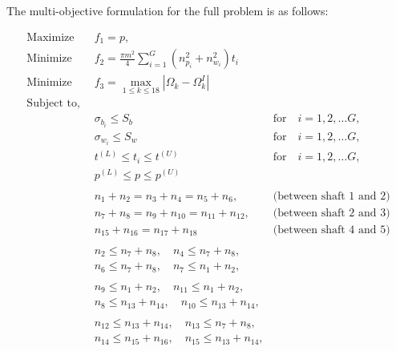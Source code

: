 The multi-objective formulation for the full problem is as follows:
\begin{singlespacing}
\begin{flushleft}


{\allowdisplaybreaks 
  \begin{align}
    \text{Maximize} \quad &f_1 =     \left. p,       \right.\\
    \text{Minimize} \quad &f_2 = \left. \frac{\pi m^2}{4} {\displaystyle\sum\limits_{i=1}^G {({n^2_{p_i}} + {n^2_{w_i}}) t_i }}\right.\\
    \text{Minimize} \quad &f_3 = \left. \max_{1 \le k \le 18}{|\Omega_k-{\Omega}_k^I|} \right. \\  
    \text{Subject to,}& \qquad  \left. \right.\nonumber \\
    &{\sigma}_{b_i} \leqslant  S_b \quad  &\left. \text{for} \quad i = 1, 2, \dots G, \right.\\
    &{\sigma}_{w_i} \leqslant S_w \quad   &\left. \text{for} \quad i = 1, 2, \dots G, \right.\\
    &t^{(L)} \leqslant t_i \leqslant t^{(U)}   &\left. \text{for} \quad i = 1, 2, \dots G, \right.\\
    &p^{(L)} \leqslant p \leqslant p^{(U)} \\
    \nonumber \\
    &n_1 + n_2 = n_3 + n_4 = n_5 + n_6,  \quad &\left. \text{(between shaft 1 and 2)} \right.\nonumber\\
    &n_7 + n_8 = n_9 + n_{10} = n_{11} + n_{12}, \quad &\left. \text{(between shaft 2 and 3)} \right.\nonumber\\
    &n_{15} + n_{16} = n_{17} + n_{18} \quad &\left. \text{(between shaft 4 and 5)} \right.\\
    \nonumber\\
    &n_2 \leqslant n_7 + n_8, \quad n_4 \leqslant n_7 + n_8, \nonumber\\
    &n_6 \leqslant n_7 + n_8, \quad n_7 \leqslant n_1 + n_2, \\
    \nonumber\\
    &n_9 \leqslant n_1 + n_2, \quad n_{11} \leqslant n_1 + n_2, \nonumber\\
    &n_8 \leqslant n_{13} + n_{14}, \quad n_{10} \leqslant n_{13} + n_{14},\\
    \nonumber\\
    &n_{12} \leqslant n_{13} + n_{14}, \quad n_{13} \leqslant n_7 + n_8, \nonumber\\
    &n_{14} \leqslant n_{15} + n_{16}, \quad n_{15} \leqslant n_{13} + n_{14},\\

\end{align}}
\end{flushleft}
\end{singlespacing}

